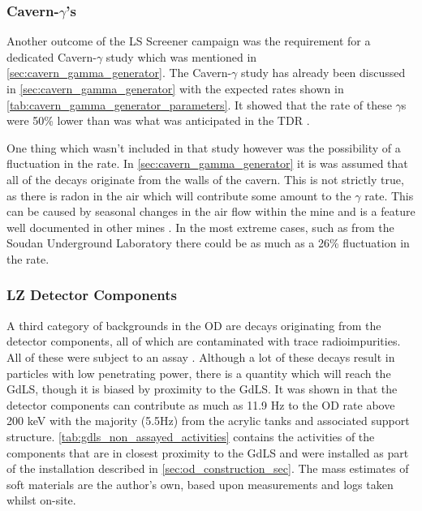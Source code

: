 


\subsubsection{Cavern-$\gamma$'s}
\par
Another outcome of the LS Screener campaign was the requirement for a dedicated Cavern-$\gamma$ study which was mentioned in \autoref{sec:cavern_gamma_generator}.
The Cavern-$\gamma$ study has already been discussed in \autoref{sec:cavern_gamma_generator} with the expected rates shown in \autoref{tab:cavern_gamma_generator_parameters}.
It showed that the rate of these $\gamma$s were 50\% lower than was what was anticipated in the TDR \cite{LZ_TechnicalDesignReview_ref}.
\par
One thing which wasn't included in that study however was the possibility of a fluctuation in the rate.
In \autoref{sec:cavern_gamma_generator} it is was assumed that all of the decays originate from the walls of the cavern.
This is not strictly true, as there is radon in the air which will contribute some amount to the $\gamma$ rate.
This can be caused by seasonal changes in the air flow within the mine and is a feature well documented in other mines \cite{finnish_mine_radon_ref,nepal_mine_radon_ref,minos_annual_modulation_ref}.
In the most extreme cases, such as from the Soudan Underground Laboratory \cite{cavern_gammas_in_Soudan_mine_ref} there could be as much as a 26\% fluctuation in the rate.

\subsubsection{LZ Detector Components}
\par
A third category of backgrounds in the OD are decays originating from the detector components, all of which are contaminated with trace radioimpurities.
All of these were subject to an assay \cite{LZ_assay_ref}.
Although a lot of these decays result in particles with low penetrating power, there is a quantity which will reach the GdLS, though it is biased by proximity to the GdLS.
It was shown in \cite{scotthaselschwardt_thesis_ref} that the detector components can contribute as much as 11.9 Hz to the OD rate above 200 keV with the majority (5.5Hz) from the acrylic tanks and associated support structure.
\autoref{tab:gdls_non_assayed_activities} contains the activities of the components that are in closest proximity to the GdLS and were installed as part of the installation described in \autoref{sec:od_construction_sec}.
The mass estimates of soft materials are the author's own, based upon measurements and logs taken whilst on-site.

